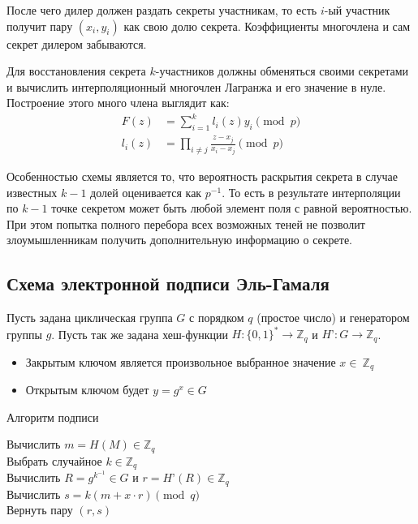 \documentclass[a4paper,12pt]{article}
\theoremstyle{definition}
\begin{document}
		После чего дилер должен раздать секреты участникам, то есть $i$-ый участник получит пару $(x_i, y_i)$ как свою долю секрета. Коэффициенты многочлена и сам секрет дилером забываются.
		
		Для восстановления секрета $k$-участников должны обменяться своими секретами и вычислить интерполяционный многочлен Лагранжа и его значение в нуле. Построение этого много члена выглядит как:
		\begin{align*}
			F(z) &= \sum_{i=1}^{k} l_i(z) y_i \pmod p  \\
			l_i(z) &= \prod_{i\ne j} \frac{z-x_j}{x_i - x_j} \pmod p 
		\end{align*}
	
		Особенностью схемы является то, что вероятность раскрытия секрета в случае известных $k-1$ долей оценивается как $p^{-1}$. То есть в результате интерполяции по $k-1$ точке секретом может быть любой элемент поля с равной вероятностью. При этом попытка полного перебора всех возможных теней не позволит злоумышленникам получить дополнительную информацию о секрете.
		
		\subsection{Схема электронной подписи Эль-Гамаля} \label{applic:ElGam}
		
		Пусть задана циклическая группа $G$ с порядком $q$ (простое число) и генератором группы $g$. Пусть так же задана хеш-функции $H: \{0, 1\}^* \rightarrow \mathbb Z_q$ и $H’: G \rightarrow \mathbb Z_q$.
		
		\begin{itemize}
			\item Закрытым ключом является произвольное выбранное значение $x\in~\mathbb Z_q$
			\item Открытым ключом будет $y=g^x \in G$
		\end{itemize}

	

		\begin{algorithm}[H]
			\caption{Алгоритм подписи}
			\label{alg:EGsign}
			

			Вычислить $m=H(M)\in \mathbb Z_q$
			\\Выбрать случайное $k \in \mathbb Z_q$
			\\Вычислить $R=g^{k^{-1}} \in G$ и $r=H’(R) \in \mathbb Z_q$
			\\Вычислить $s=k(m + x\cdot r) \pmod q$
			\\Вернуть пару $(r, s)$
			
		\end{algorithm}		
	
\end{document}
